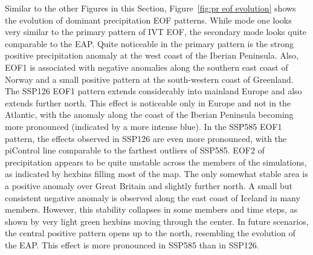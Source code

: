 Similar to the other Figures in this Section, Figure~\ref{fig:pr eof evolution} shows the evolution of dominant precipitation EOF patterns. 
While mode one looks very similar to the primary pattern of IVT EOF, the secondary mode looks quite comparable to the EAP. 
Quite noticeable in the primary pattern is the strong positive precipitation anomaly at the west coast of the Iberian Peninsula. 
Also, EOF1 is associated with negative anomalies along the southern east coast of Norway and a small positive pattern at the south-western coast of Greenland. 
The SSP126 EOF1 pattern extends considerably into mainland Europe and also extends further north. 
This effect is noticeable only in Europe and not in the Atlantic, with the anomaly along the coast of the Iberian Peninsula becoming more pronounced (indicated by a more intense blue). 
In the SSP585 EOF1 pattern, the effects observed in SSP126 are even more pronounced, with the piControl line comparable to the farthest outliers of SSP585.
EOF2 of precipitation appears to be quite unstable across the members of the simulations, as indicated by hexbins filling most of the map. The only somewhat stable area is a positive anomaly over Great Britain and slightly further north. A small but consistent negative anomaly is observed along the east coast of Iceland in many members. However, this stability collapses in some members and time steps, as shown by very light green hexbins moving through the center. In future scenarios, the central positive pattern opens up to the north, resembling the evolution of the EAP. This effect is more pronounced in SSP585 than in SSP126.



